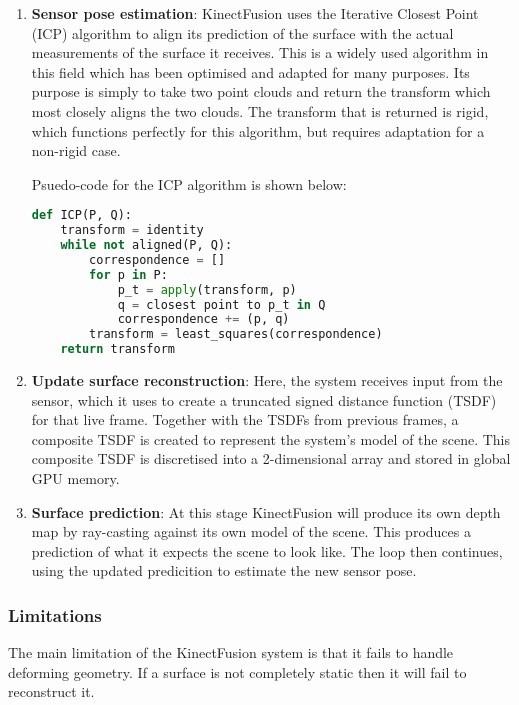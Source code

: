 \documentclass[a4paper]{article}
\begin{document}
\begin{enumerate}
\item \textbf{Sensor pose estimation}: KinectFusion uses the Iterative Closest Point (ICP) algorithm to align its prediction of the surface with the actual measurements of the surface it receives. This is a widely used algorithm in this field which has been optimised and adapted for many purposes. Its purpose is simply to take two point clouds and return the transform which most closely aligns the two clouds. The transform that is returned is rigid, which functions perfectly for this algorithm, but requires adaptation for a non-rigid case. 

Psuedo-code for the ICP algorithm is shown below:

\begin{lstlisting}[language=Python]
def ICP(P, Q):
    transform = identity
    while not aligned(P, Q):
        correspondence = []
        for p in P:
            p_t = apply(transform, p)
            q = closest point to p_t in Q
            correspondence += (p, q)
        transform = least_squares(correspondence)
    return transform
\end{lstlisting}


\item \textbf{Update surface reconstruction}: Here, the system receives input from the sensor, which it uses to create a truncated signed distance function (TSDF) for that live frame. Together with the TSDFs from previous frames, a composite TSDF is created to represent the system's model of the scene. This composite TSDF is discretised into a 2-dimensional array and stored in global GPU memory.

\item \textbf{Surface prediction}: At this stage KinectFusion will produce its own depth map by ray-casting against its own model of the scene. This produces a prediction of what it expects the scene to look like. The loop then continues, using the updated predicition to estimate the new sensor pose.
\end{enumerate}


\subsubsection{Limitations}

The main limitation of the KinectFusion system is that it fails to handle deforming geometry. If a surface is not completely static then it will fail to reconstruct it.  
\end{document}
